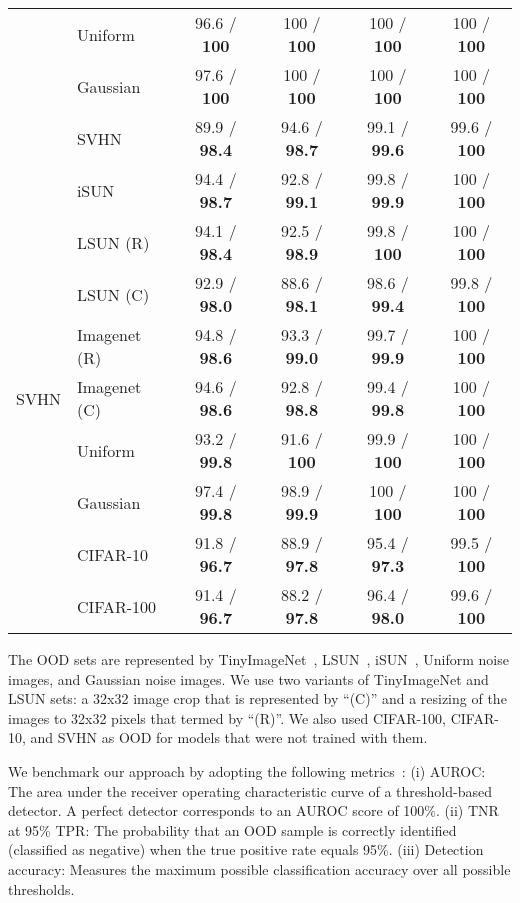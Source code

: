 \documentclass{article}
\newcommand{\minisection}[1]{\vspace{2mm}\noindent{\textbf{#1.}}}
\begin{document}
\begin{table}[tb]
\begin{tabular}{clcccc}
     & Uniform &   96.6 / \textbf{100} &    100 / \textbf{100} &    100 / \textbf{100} &    100 / \textbf{100} \\
     & Gaussian &   97.6 / \textbf{100} &    100 / \textbf{100} &    100 / \textbf{100} &    100 / \textbf{100} \\
     & SVHN &  89.9 / \textbf{98.4} &  94.6 / \textbf{98.7} &  99.1 / \textbf{99.6} &   99.6 / \textbf{100} \\
\midrule
\multirow{9}{*}{SVHN} & iSUN &  94.4 / \textbf{98.7} &  92.8 / \textbf{99.1} &  99.8 / \textbf{99.9} &    100 / \textbf{100} \\
     & LSUN (R) &  94.1 / \textbf{98.4} &  92.5 / \textbf{98.9} &   99.8 / \textbf{100} &    100 / \textbf{100} \\
     & LSUN (C) &  92.9 / \textbf{98.0} &  88.6 / \textbf{98.1} &  98.6 / \textbf{99.4} &   99.8 / \textbf{100} \\
     & Imagenet (R) &  94.8 / \textbf{98.6} &  93.3 / \textbf{99.0} &  99.7 / \textbf{99.9} &    100 / \textbf{100} \\
     & Imagenet (C) &  94.6 / \textbf{98.6} &  92.8 / \textbf{98.8} &  99.4 / \textbf{99.8} &    100 / \textbf{100} \\
     & Uniform &  93.2 / \textbf{99.8} &   91.6 / \textbf{100} &   99.9 / \textbf{100} &    100 / \textbf{100} \\
     & Gaussian &  97.4 / \textbf{99.8} &  98.9 / \textbf{99.9} &    100 / \textbf{100} &    100 / \textbf{100} \\
     & CIFAR-10 &  91.8 / \textbf{96.7} &  88.9 / \textbf{97.8} &  95.4 / \textbf{97.3} &   99.5 / \textbf{100} \\
     & CIFAR-100 &  91.4 / \textbf{96.7} &  88.2 / \textbf{97.8} &  96.4 / \textbf{98.0} &   99.6 / \textbf{100} \\
\bottomrule
\end{tabular}
 \end{table}


\minisection{OOD sets}
The OOD sets are represented by TinyImageNet~\citep{liang2017enhancing}, LSUN~\citep{yu15lsun}, iSUN~\citep{xu2015turkergaze}, Uniform noise images, and Gaussian noise images. 
We use two variants of TinyImageNet and LSUN sets: a 32x32 image crop that is represented by ``(C)'' and a resizing of the images to 32x32 pixels that termed by ``(R)''.
We also used CIFAR-100, CIFAR-10, and SVHN as OOD for models that were not trained with them.

\minisection{Evaluation methodology}
We benchmark our approach by adopting the following metrics~\citep{gram,lee2018simple}: 
(i) AUROC: The area under the receiver operating characteristic curve of a threshold-based detector. A perfect detector corresponds to an AUROC score of 100\%.
(ii) TNR at 95\% TPR: The probability that an OOD sample is correctly identified (classified as negative) when the true positive rate equals 95\%.
(iii) Detection accuracy: Measures the maximum possible classification accuracy over all possible thresholds.
\end{document}

